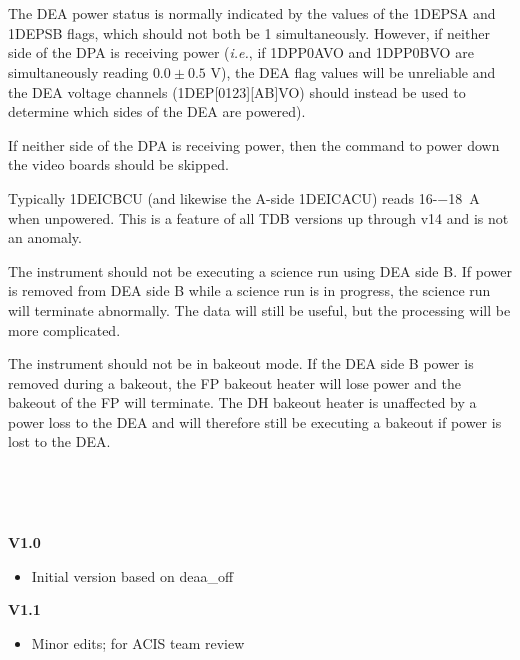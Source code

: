 \documentclass[11pt]{article}
\begin{document}
\normalsize
{} \\
\normalsize

\normalsize
{} \\
\normalsize

The DEA power status is normally indicated by the values of the 1DEPSA and
1DEPSB flags, which should not both be 1 simultaneously.
However, if neither side of the DPA is receiving power
({\it i.e.}, if 1DPP0AVO and 1DPP0BVO are simultaneously reading $0.0 \pm 0.5$ V),
the DEA flag values will be unreliable and the DEA voltage
channels (1DEP[0123][AB]VO) should instead be used to determine which
sides of the DEA are powered).

If neither side of the DPA is receiving power, then the command to power down the
video boards should be skipped.

Typically 1DEICBCU (and likewise the A-side 1DEICACU) reads 16-−18~A when
unpowered. This is a feature of all TDB versions up through v14 and is
not an anomaly.

The instrument should not be executing a science run using DEA side B.
If power is removed from DEA side B while a science run is in progress, the science
run will terminate abnormally.
The data will still be useful, but the processing will be more complicated.

The instrument should not be in bakeout mode. If the DEA side B power is
removed during a bakeout, the FP bakeout heater will lose power and the bakeout of
the FP will terminate. The DH bakeout heater is unaffected by a power loss to the
DEA and will therefore still be executing a bakeout if power is lost to the DEA.



\vspace{0.15in}
\normalsize
{} \\
\normalsize

\normalsize
{} \\
\normalsize

{\bf V1.0}
\begin{itemize}
\item Initial version based on deaa\_off
\end{itemize}

{\bf V1.1}
\begin{itemize}
\item Minor edits; for ACIS team review
\end{itemize}
\end{document}
